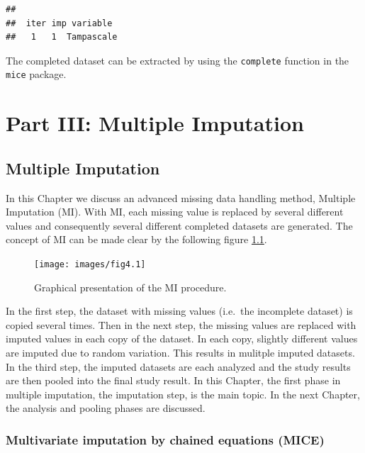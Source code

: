 \documentclass[
]{book}
\begin{document}
\begin{verbatim}
## 
##  iter imp variable
##   1   1  Tampascale
\end{verbatim}

The completed dataset can be extracted by using the \texttt{complete} function in the \texttt{mice} package.

\hypertarget{part-part-iii-multiple-imputation}{%
\part{Part III: Multiple Imputation}\label{part-part-iii-multiple-imputation}}

\hypertarget{multiple-imputation}{%
\chapter{Multiple Imputation}\label{multiple-imputation}}

In this Chapter we discuss an advanced missing data handling method, Multiple Imputation (MI). With MI, each missing value is replaced by several different values and consequently several different completed datasets are generated. The concept of MI can be made clear by the following figure \ref{fig:fig4-1}.

\begin{figure}

{\centering \texttt{[image: images/fig4.1]} 

}

\caption{Graphical presentation of the MI procedure.}\label{fig:fig4-1}
\end{figure}

In the first step, the dataset with missing values (i.e.~the incomplete dataset) is copied several times. Then in the next step, the missing values are replaced with imputed values in each copy of the dataset. In each copy, slightly different values are imputed due to random variation. This results in mulitple imputed datasets. In the third step, the imputed datasets are each analyzed and the study results are then pooled into the final study result. In this Chapter, the first phase in multiple imputation, the imputation step, is the main topic. In the next Chapter, the analysis and pooling phases are discussed.

\hypertarget{multivariate-imputation-by-chained-equations-mice}{%
\section{Multivariate imputation by chained equations (MICE)}\label{multivariate-imputation-by-chained-equations-mice}}
\end{document}
